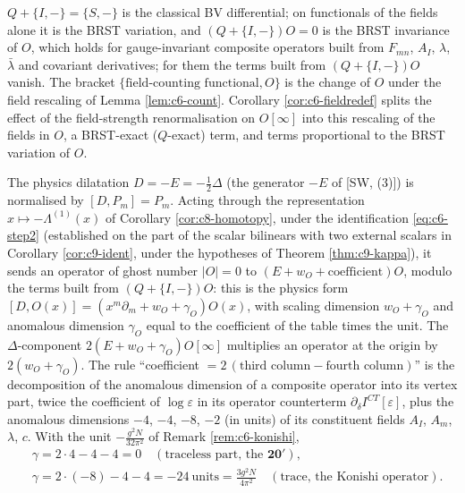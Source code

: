 \begin{remark}
$Q+\{I,-\}=\{S,-\}$ is the classical BV differential; on functionals of the fields alone it is the BRST variation, and $(Q+\{I,-\})O=0$ is the BRST invariance of $O$, which holds for gauge-invariant composite operators built from $F_{mn}$, $A_I$, $\lambda$, $\bar\lambda$ and covariant derivatives; for them the terms built from $(Q+\{I,-\})O$ vanish. The bracket $\{\text{field-counting functional},O\}$ is the change of $O$ under the field rescaling of Lemma \ref{lem:c6-count}. Corollary \ref{cor:c6-fieldredef} splits the effect of the field-strength renormalisation on $O[\infty]$ into this rescaling of the fields in $O$, a BRST-exact ($Q$-exact) term, and terms proportional to the BRST variation of $O$.
\end{remark}

\begin{remark}
The physics dilatation $D=-E=-\tfrac12\Delta$ (the generator $-E$ of [SW, (3)]) is normalised by $[D,P_m]=P_m$. Acting through the representation $x\mapsto-\Lambda^{(1)}(x)$ of Corollary \ref{cor:c8-homotopy}, under the identification \eqref{eq:c6-step2} (established on the part of the scalar bilinears with two external scalars in Corollary \ref{cor:c9-ident}, under the hypotheses of Theorem \ref{thm:c9-kappa}), it sends an operator of ghost number $|O|=0$ to $(E+w_O+\text{coefficient})O$, modulo the terms built from $(Q+\{I,-\})O$: this is the physics form $[D,O(x)]=(x^m\partial_m+w_O+\gamma_O)O(x)$, with scaling dimension $w_O+\gamma_O$ and anomalous dimension $\gamma_O$ equal to the coefficient of the table times the unit. The $\Delta$-component $2(E+w_O+\gamma_O)O[\infty]$ multiplies an operator at the origin by $2(w_O+\gamma_O)$. The rule ``coefficient $=2\,(\text{third column}-\text{fourth column})$'' is the decomposition of the anomalous dimension of a composite operator into its vertex part, twice the coefficient of $\log\varepsilon$ in its operator counterterm $\partial_\delta I^{CT}[\varepsilon]$, plus the anomalous dimensions $-4$, $-4$, $-8$, $-2$ (in units) of its constituent fields $A_I$, $A_m$, $\lambda$, $c$. With the unit $-\frac{g^2N}{32\pi^2}$ of Remark \ref{rem:c6-konishi},
\[
\begin{aligned}&\gamma=2\cdot4-4-4=0\quad(\text{traceless part, the }\mathbf{20'}),\\ &\gamma=2\cdot(-8)-4-4=-24\ \text{units}=\frac{3g^2N}{4\pi^2}\quad(\text{trace, the Konishi operator}).\end{aligned}
\]
\end{remark}

